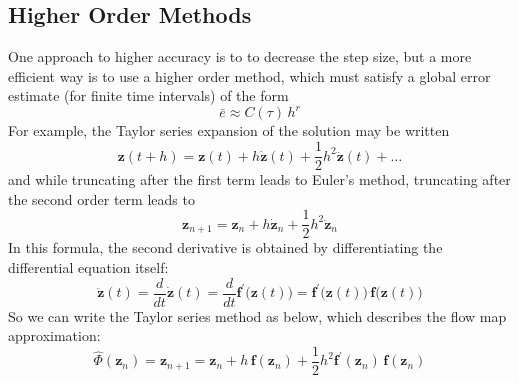 \documentclass{article}
\theoremstyle{remark}
\theoremstyle{definition}
\begin{document}
\subsection{Higher Order Methods}
One approach to higher accuracy is to to decrease the step size, but a more efficient way is to use a higher order method, which must satisfy a global error estimate (for finite time intervals) of the form 
\[\bar{e} \approx C(\tau) \, h ^r\]
For example, the Taylor series expansion of the solution may be written 
\[\mathbf{z}(t + h) = \mathbf{z}(t) + h \boldsymbol{\dot{z}} (t) + \frac{1}{2} h^2 \boldsymbol{\ddot{z}}(t) + \ldots\]
and while truncating after the first term leads to Euler's method, truncating after the second order term leads to 
\[\mathbf{z}_{n+1} = \mathbf{z}_n + h\boldsymbol{\dot{z}}_n + \frac{1}{2} h^2 \boldsymbol{\ddot{z}}_n\]
In this formula, the second derivative is obtained by differentiating the differential equation itself: 
\[\boldsymbol{\ddot{z}}(t) = \frac{d}{dt} \boldsymbol{\dot{z}}(t) = \frac{d}{dt} \mathbf{f}^\prime \big( \mathbf{z}(t)\big) = \mathbf{f}^\prime\big( \mathbf{z}(t)\big) \, \mathbf{f}\big(\mathbf{z}(t)\big)\]
So we can write the Taylor series method as below, which describes the flow map approximation: 
\[\hat{\Phi} (\mathbf{z}_{n}) = \mathbf{z}_{n+1} = \mathbf{z}_n + h\, \mathbf{f}(\mathbf{z}_n) + \frac{1}{2} h^2 \mathbf{f}^\prime (\mathbf{z}_n) \, \mathbf{f}(\mathbf{z}_n)\]
\end{document}
